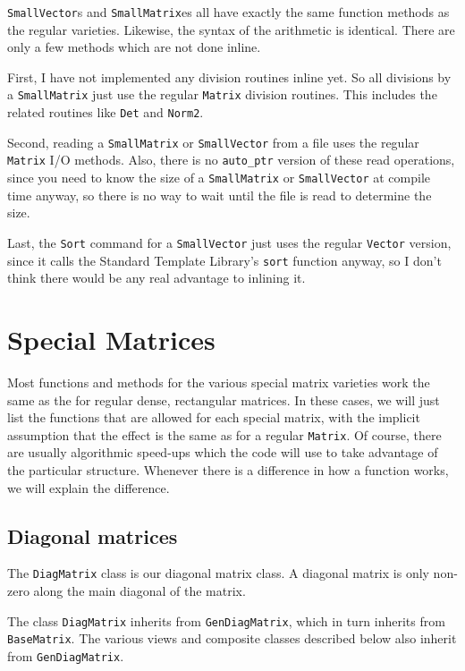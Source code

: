 \documentclass[twoside,letterpaper,11pt]{article}
\renewcommand{\tt}[1]{{\texttt {#1}}}
\begin{document}
\tt{SmallVector}s and \tt{SmallMatrix}es all have exactly the same
function methods as the regular varieties.  Likewise, the syntax of the
arithmetic is identical.  There are only a few methods which 
are not done inline.  

First, I have not implemented any division routines inline yet.  So 
all divisions by a \tt{SmallMatrix} just use the regular 
\tt{Matrix} division routines.  This includes the related 
routines like \tt{Det} and \tt{Norm2}.

Second, reading a \tt{SmallMatrix} or \tt{SmallVector} from a file 
uses the regular
\tt{Matrix} I/O methods.  Also, there is no \tt{auto\_ptr} 
version of these read operations, since you need to know the 
size of a \tt{SmallMatrix} or \tt{SmallVector} at compile time anyway, 
so there is no way to wait until the file is read to determine the size.

Last, the \tt{Sort} command for a \tt{SmallVector} just uses the
regular \tt{Vector} version, since it calls the Standard Template
Library's \tt{sort} function anyway, so I don't think there would 
be any real advantage to inlining it.

\newpage
\section{Special Matrices}

Most functions and methods for the various special matrix varieties work the same
as the for regular dense, rectangular matrices.  
In these cases, we will just list the functions
that are allowed for each special matrix, with the implicit assumption that the 
effect is the same as for a regular \tt{Matrix}.  Of course, there are usually 
algorithmic speed-ups which the code will use to take advantage of the 
particular structure.
Whenever there is a difference in how a function works,
we will explain the difference.

\subsection{Diagonal matrices}

The \tt{DiagMatrix} class is our diagonal matrix class.  
A diagonal matrix is only non-zero
along the main diagonal of the matrix.  

The class \tt{DiagMatrix} inherits from \tt{GenDiagMatrix},
which in turn inherits from \tt{BaseMatrix}.
The various views and composite classes described below
also inherit from \tt{GenDiagMatrix}.
\end{document}
